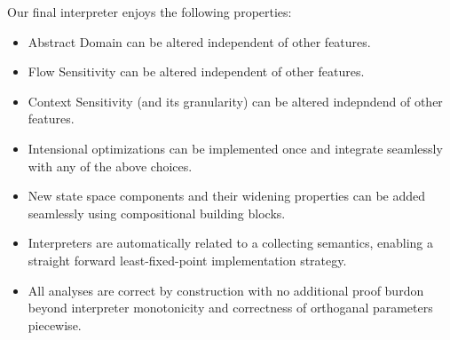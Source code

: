 \documentclass[pldi]{sigplanconf}
\begin{document}
Our final interpreter enjoys the following properties:
\begin{itemize}
\item Abstract Domain can be altered independent of other features.
\item Flow Sensitivity can be altered independent of other features.
\item Context Sensitivity (and its granularity) can be altered indepndend of other features.
\item Intensional optimizations can be implemented once and integrate seamlessly with any of the above choices.
\item New state space components and their widening properties can be added seamlessly using compositional building blocks.
\item Interpreters are automatically related to a collecting semantics, enabling a straight forward least-fixed-point implementation strategy.
\item All analyses are correct by construction with no additional proof burdon beyond interpreter monotonicity and correctness of orthoganal parameters piecewise.
\end{itemize}

\end{document}
